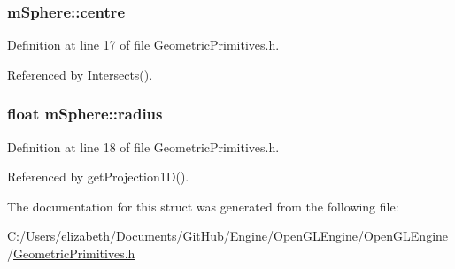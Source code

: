 \subsubsection[{\texorpdfstring{centre}{centre}}]{ m\+Sphere\+::centre}\hypertarget{structm_sphere_a8d00b6777a45df63673bc9618fa2a578}{}\label{structm_sphere_a8d00b6777a45df63673bc9618fa2a578}


Definition at line 17 of file Geometric\+Primitives.\+h.



Referenced by Intersects().

\subsubsection[{\texorpdfstring{radius}{radius}}]{\setlength{\rightskip}{0pt plus 5cm}float m\+Sphere\+::radius}\hypertarget{structm_sphere_a243b1a0cdd4bf9b26fbdaf9d40e6fca8}{}\label{structm_sphere_a243b1a0cdd4bf9b26fbdaf9d40e6fca8}


Definition at line 18 of file Geometric\+Primitives.\+h.



Referenced by get\+Projection1\+D().



The documentation for this struct was generated from the following file\+:\begin{DoxyCompactItemize}
\item 
C\+:/\+Users/elizabeth/\+Documents/\+Git\+Hub/\+Engine/\+Open\+G\+L\+Engine/\+Open\+G\+L\+Engine/\hyperlink{_geometric_primitives_8h}{Geometric\+Primitives.\+h}\end{DoxyCompactItemize}
